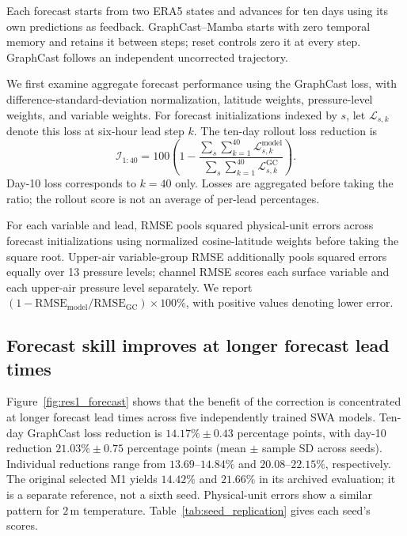 \documentclass{article}
\newcommand{\vfourchange}[1]{{\color{blue}#1}}
\begin{document}
\vfourchange{Each forecast starts from two ERA5 states and advances for ten days using its own predictions as feedback. GraphCast--Mamba starts with zero temporal memory and retains it between steps; reset controls zero it at every step. GraphCast follows an independent uncorrected trajectory.}

We first examine aggregate forecast performance using the {GraphCast loss}, with difference-standard-deviation normalization, latitude weights, pressure-level weights, and variable weights. For forecast initializations indexed by $s$, let $\mathcal{L}_{s,k}$ denote this loss at six-hour lead step $k$. The ten-day rollout loss reduction is
\begin{equation}
    \mathcal{I}_{1:40}=100\left(1-
    \frac{\sum_s\sum_{k=1}^{40}\mathcal{L}^{\mathrm{model}}_{s,k}}
         {\sum_s\sum_{k=1}^{40}\mathcal{L}^{\mathrm{GC}}_{s,k}}\right).
    \label{eq:v3_loss_reduction}
\end{equation}
Day-10 loss corresponds to $k=40$ only. Losses are aggregated before taking the ratio; the rollout score is not an average of per-lead percentages.

For each variable and lead, RMSE pools squared physical-unit errors across forecast initializations using normalized cosine-latitude weights before taking the square root. Upper-air variable-group RMSE additionally pools squared errors equally over 13 pressure levels; channel RMSE scores each surface variable and each upper-air pressure level separately. We report $(1-\mathrm{RMSE}_{\mathrm{model}}/\mathrm{RMSE}_{\mathrm{GC}})\times 100\%$, with positive values denoting lower error.

\subsection{Forecast skill improves at longer forecast lead times}

Figure~\ref{fig:res1_forecast} shows that the benefit of the correction is concentrated at longer forecast lead times\vfourchange{ across five independently trained SWA models}. \vfourchange{Ten-day GraphCast loss reduction is $14.17\%\pm0.43$ percentage points, with day-10 reduction $21.03\%\pm0.75$ percentage points (mean $\pm$ sample SD across seeds). Individual reductions range from $13.69$--$14.84\%$ and $20.08$--$22.15\%$, respectively. The original selected M1 yields $14.42\%$ and $21.66\%$ in its archived evaluation; it is a separate reference, not a sixth seed.} Physical-unit errors show a similar pattern\vfourchange{ for $2$\,m temperature}. \vfourchange{Table~\ref{tab:seed_replication} gives each seed's scores.}
\end{document}
